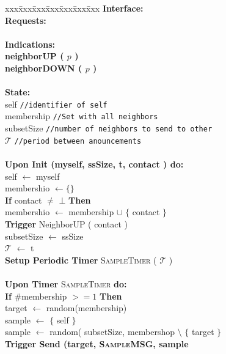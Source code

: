 \documentclass[10pt,a4paper]{article}
\begin{document}
\begin{algorithm}[h!]
\label{alg:foreach}
\caption{Simple Full Membership}
\begin{tabbing}
xxx\=xxx\=xxx\=xxx\=xxx\=xxx\=xxx\kill
\textbf{Interface:}\\
\> \textbf{Requests:}\\
~\\
\> \textbf{Indications:}\\
\> \> \textbf{neighborUP ( $p$ )} \\
\> \> \textbf{neighborDOWN ( $p$ )} \\
~\\
\textbf{State:}\\
\> self \texttt{//identifier of self}\\
\> membership \texttt{//Set with all neighbors}\\
\> subsetSize \texttt{//number of neighbors to send to other}\\
\> $\mathcal{T}$ \texttt{//period between anouncements}\\
~\\
\> \textbf{Upon Init (myself, ssSize, t, contact ) do:}\\
\> \> self $\longleftarrow$ myself\\
\> \> membershio $\longleftarrow \{ \} $\\
\> \> \textbf{If} contact $\not=$ $\bot$ \textbf{Then}\\
\> \> \> membershio $\longleftarrow$ membership $\cup$ $\{$ contact $\}$\\
\> \> \> \textbf{Trigger} NeighborUP ( contact ) \\
\> \> subsetSize $\longleftarrow$ ssSize\\
\> \> $\mathcal{T}$ $\longleftarrow$ t\\
\> \> \textbf{Setup Periodic Timer} \textsc{SampleTimer} ( $\mathcal{T}$ )\\
~\\
\> \textbf{Upon Timer} \textsc{SampleTimer} \textbf{do:}\\
\> \> \textbf{If} \#membership $>= 1$ \textbf{Then}\\
\> \> \> target $\longleftarrow$ random(membership)\\
\> \> \> sample $\longleftarrow$ $\{$ self $\}$\\ 
\> \> \> sample $\longleftarrow$ random( subsetSize, membershop $\setminus$ $\{$ target $\}$\\
\> \> \> \textbf{Trigger Send (target, \textsc{SampleMSG}, sample}\\

\end{tabbing}
\end{algorithm}
\end{document}
